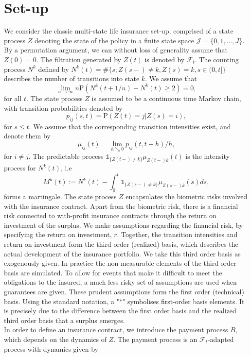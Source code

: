 \documentclass[12pt]{article}
\newcommand{\indic}[1]{\mathds{1}_{ \{ #1 \} }}
\renewcommand{\P}{\text{P}}
\theoremstyle{my_thm}
\begin{document}
\section{Set-up} \label{sec:Set_1}
We consider the classic multi-state life insurance set-up, comprised of a state process $Z$ denoting the state of the policy in a finite state space $\mathcal{J}=\{0,1,...,J\}$. By a permutation argument, we can without loss of generality assume that $Z(0)=0$. The filtration generated by $Z(t)$ is denoted by $\mathcal{F}_t$. The counting process $N^{k}$ defined by $N^{k}(t)=\# \{ s; Z(s-) \neq k, Z(s)=k, s \in (0,t] \}$ describes the number of transitions into state $k$. We assume that 
\begin{equation}
\lim_{n \rightarrow \infty} n \P( N^k(t+1/n) - N^k(t) \geq 2)=0, \label{eq:AAW}
\end{equation}
for all $t$. The state process $Z$ is assumed to be a continuous time Markov chain, with transition probabilities denoted by
$$
p_{ij}(s,t)= \P(Z(t)=j|Z(s)=i),
$$
for $s\leq t$. We assume that the corresponding transition intensities exist, and denote them by
$$
\mu_{ij}(t)=\lim_{h \searrow 0} p_{ij}(t,t+h)/h,
$$
for $i \neq j$. The predictable process $ \indic{Z(t-)\neq k }\mu_{Z(t-)k}(t)$ is the intensity process for $N^{k}(t)$, i.e
$$
M^{k}(t):=N^k(t)-\int_0^t \indic{Z(s-)\neq k } \mu_{Z(s-)k}(s) ds,
$$
forms a martingale. The state process $Z$ encapsulates the biometric risks involved with the insurance contract. Apart from the biometric risk, there is a financial risk connected to with-profit insurance contracts through the return on investment of the surplus. We make assumptions regarding the financial risk, by specifying the return on investment, $r$. Together, the transition intensities and return on investment form the third order (realized) basis, which describes the actual development of the insurance portfolio. We take this third order basis as exogenously given. In practice the non-measurable elements of the third order basis are simulated. To allow for events that make it difficult to meet the obligations to the insured, a much less risky set of assumptions are used when guarantees are given. These prudent assumptions form the first order (technical) basis. Using the standard notation, a "$*$" symbolises first-order basis elements. It is precisely due to the difference between the first order basis and the realized third order basis that a surplus emerges.
\\
In order to define an insurance contract, we introduce the payment process $B$, which depends on the dynamics of $Z$. The payment process is an $\mathcal{F}_t$-adapted process with dynamics given by
\end{document}
